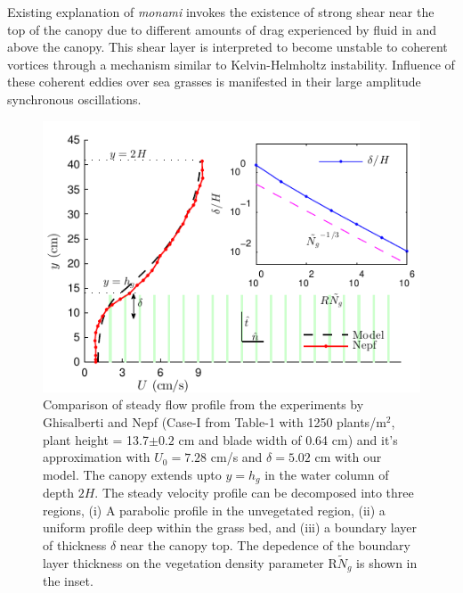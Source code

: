 \documentclass[aps,prl,reprint,twocolumn,showpacs,superscriptaddress,10pt]{revtex4-1}  %
\newcommand{\Rey}{\text{R}}
\newcommand{\Ndg}{\tilde{N}_g}
\newcommand{\monami}{\textit{monami }}
\begin{document}
Existing explanation of \monami invokes the existence of strong shear near the top of the canopy \cite{Ghisal02,Raupach96} due to different amounts of drag experienced by fluid in and above the canopy. 
This shear layer is interpreted to become unstable to coherent vortices through a mechanism similar to Kelvin-Helmholtz instability. 
Influence of these coherent eddies over sea grasses is manifested in their large amplitude synchronous oscillations.

\begin{figure}
\includegraphics[scale=1]{Grass_Base_Nepf_shear}
\caption{Comparison of steady flow profile from the experiments by Ghisalberti and Nepf\cite{Nepf04} (Case-I from Table-1 with 1250 plants/m$^2$, 
plant height = 13.7$\pm 0.2$ cm and blade width of 0.64 cm)
 and it's approximation with $U_0=7.28$ cm/s and $\delta = 5.02$ cm with our model. The canopy extends upto $y=h_g$ in the water column of depth $2H$. 
The steady velocity profile can be decomposed into three regions, (i) A parabolic profile in the unvegetated region, (ii) a uniform profile deep within the grass bed, and (iii) a boundary layer of thickness $\delta$ near the canopy top. 
The depedence of the boundary layer thickness on the vegetation density parameter $\Rey \Ndg$ is shown in the inset.}
\label{basicflow}
\end{figure}
\end{document}
